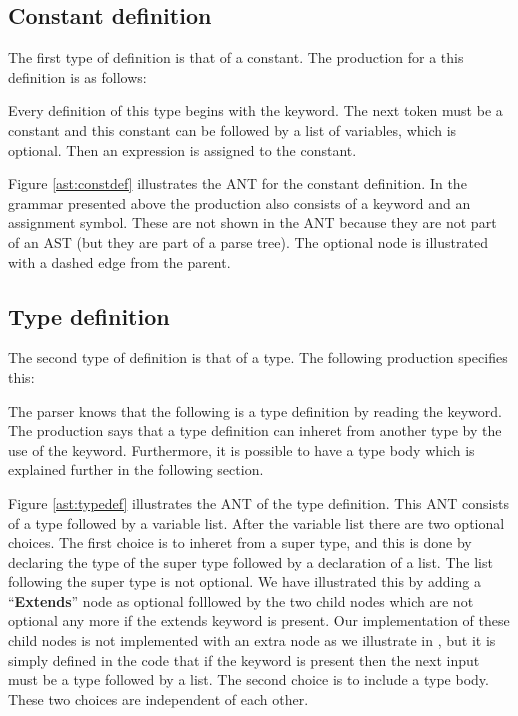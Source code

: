 \subsection{Constant definition}
The first type of definition is that of a constant. The production for a
this definition is as follows:

\begin{ebnf}
\end{ebnf}

Every definition of this type begins with the  keyword. The next
token must be a constant and this constant can be followed by a list of
variables, which is optional. Then an expression is assigned to the constant.



Figure \ref{ast:constdef} illustrates the ANT for the constant definition. In
the grammar presented above the production also consists of a keyword and an
assignment symbol. These are not shown in the ANT because they are not part 
of an AST (but they are part of a parse tree). The optional node is illustrated 
with a dashed edge from the parent.

\subsection{Type definition}
\label{ap:typedef}

The second type of definition is that of a type. The following production
specifies this:

\begin{ebnf}
\end{ebnf}

The parser knows that the following is a type definition by reading the
 keyword. The production says that a type definition can inheret from
another type by the use of the  keyword. Furthermore, it is
possible to have a type body which is explained further in the following
section.



Figure \ref{ast:typedef} illustrates the ANT of the type
definition. This ANT consists of a type followed by a variable
list. After the variable list there are two optional choices. The first choice
is to inheret from a super type, and this is done by declaring the type of the super
type followed by a declaration of a list. The list following the super type is
not optional. We have illustrated this by adding a ``\textbf{Extends}'' node as
optional folllowed by the two child nodes which are not optional any more if the
extends keyword is present. Our implementation of these child nodes is not
implemented with an extra node as we illustrate in , but it 
is simply defined in the code that if the
keyword is present then the next input must be a type followed by a list.
The second choice is to include a type body. These two choices are independent
of each other.

